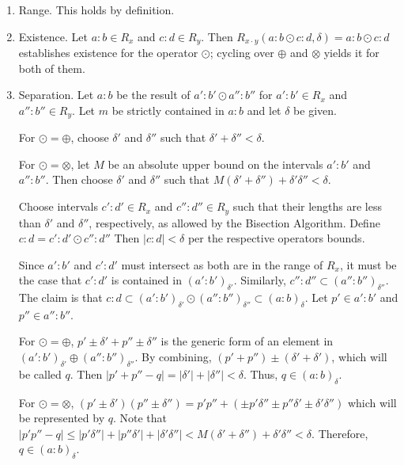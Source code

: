 \documentclass[12pt]{article}
\begin{document}
\begin{enumerate}
    \item Range. This holds by definition. 
    \item Existence. Let $a:b \in R_x$ and $c:d \in R_y$. Then $R_{x\cdot y}(a:b \odot c:d, \delta) = a:b \odot c:d$ establishes existence for the operator $\odot$; cycling over $\oplus$ and $\otimes$ yields it for both of them. 
    \item Separation. Let $a:b$ be the result of $a':b' \odot a'':b''$ for $a':b' \in R_x$ and $a'': b'' \in R_y$. Let $m$ be strictly contained in $a:b$ and let $\delta$ be given. 
    
    
    For $\odot = \oplus$, choose $\delta'$ and $\delta''$ such that $\delta' + \delta'' < \delta$. 
    
    For $\odot = \otimes$, let $M$ be an absolute upper bound on the intervals $a':b'$ and $a'':b''$. Then choose $\delta'$ and $\delta''$ such that $M (\delta' + \delta'') + \delta' \delta'' < \delta$.
    
    Choose intervals $c':d' \in R_x$ and $c'':d'' \in R_y$  such that their lengths are less than $\delta'$ and $\delta''$, respectively, as allowed by the Bisection Algorithm. Define $c:d = c':d' \odot c'':d''$ Then $|c:d| < \delta$ per the respective operators bounds. 
    
    Since $a':b'$ and $c':d'$ must intersect as both are in the range of $R_x$, it must be the case that $c':d'$ is contained in $(a':b')_{\delta'}$. Similarly, $c'':d'' \subset (a'':b'')_{\delta''}$. The claim is that $c:d \subset (a':b')_{\delta'} \odot (a'':b'')_{\delta''} \subset (a:b)_\delta$. Let $p' \in a':b'$ and $p'' \in a'':b''$. 

    For $\odot = \oplus$, $p' \pm \delta' + p'' \pm \delta''$ is the generic form of an element in $(a':b')_{\delta'} \oplus (a'':b'')_{\delta''}$. By combining, $(p' + p'') \pm (\delta' + \delta')$, which will be called $q$. Then $|p' + p'' - q| = |\delta'| + |\delta''| < \delta$. Thus, $q \in (a:b)_\delta$.

    For $\odot = \otimes$, $(p' \pm \delta')(p'' \pm \delta'') = p'p'' + (\pm p' \delta'' \pm p'' \delta' \pm \delta'\delta'')$ which will be represented by $q$. Note that $|p'p'' - q| \leq |p' \delta''| + | p'' \delta'| + | \delta'\delta''| < M(\delta' + \delta'') + \delta' \delta'' < \delta$. Therefore, $q \in (a:b)_\delta$.


\end{enumerate}
\end{document}
